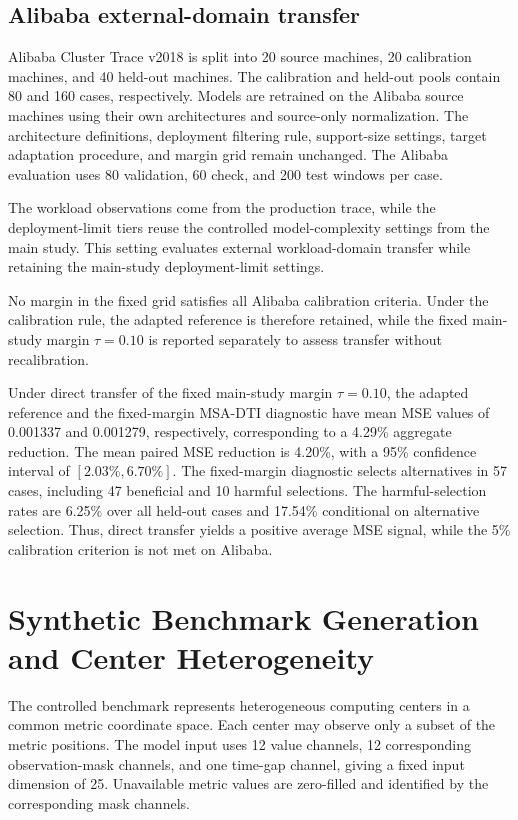 \documentclass[11pt,a4paper]{article}
\begin{document}
\subsection{Alibaba external-domain transfer}

Alibaba Cluster Trace v2018 is split into 20 source machines, 20 calibration
machines, and 40 held-out machines. The calibration and held-out pools contain
80 and 160 cases, respectively. Models are retrained on the Alibaba source
machines using their own architectures and source-only normalization. The architecture definitions, deployment filtering rule, support-size
settings, target adaptation procedure, and margin grid remain unchanged.
The Alibaba evaluation uses 80 validation, 60 check, and 200 test windows per
case.

The workload observations come from the production trace, while the
deployment-limit tiers reuse the controlled model-complexity settings from the
main study. This setting evaluates external workload-domain transfer while retaining the
main-study deployment-limit settings.

No margin in the fixed grid satisfies all Alibaba calibration criteria.
Under the calibration rule, the adapted reference is therefore retained,
while the fixed main-study margin $\tau=0.10$ is reported separately to
assess transfer without recalibration.

Under direct transfer of the fixed main-study margin $\tau=0.10$, the
adapted reference and the fixed-margin MSA-DTI diagnostic have mean MSE
values of 0.001337 and 0.001279, respectively, corresponding to a 4.29\%
aggregate reduction. The mean paired MSE reduction is 4.20\%, with a 95\%
confidence interval of $[2.03\%,6.70\%]$. The fixed-margin diagnostic selects
alternatives in 57 cases, including 47 beneficial and 10 harmful selections.
The harmful-selection rates are 6.25\% over all held-out cases and 17.54\%
conditional on alternative selection. Thus, direct transfer yields a positive
average MSE signal, while the 5\% calibration criterion is not met on
Alibaba.

\section{Synthetic Benchmark Generation and Center Heterogeneity}
\label{supp:synthetic-benchmark}

The controlled benchmark represents heterogeneous computing centers in a
common metric coordinate space.
Each center may observe only a subset of the metric positions.
The model input uses 12 value channels, 12 corresponding observation-mask
channels, and one time-gap channel, giving a fixed input dimension of 25.
Unavailable metric values are zero-filled and identified by the
corresponding mask channels.
\end{document}

